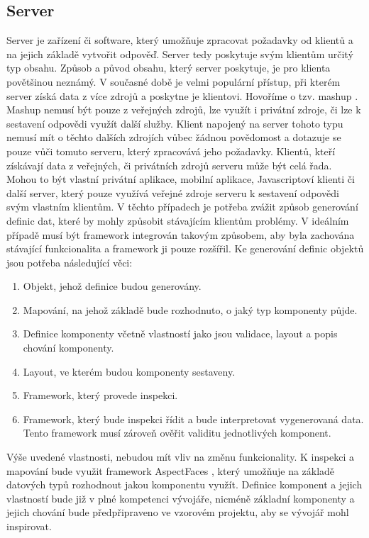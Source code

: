 \subsection{Server}
Server je zařízení či software, který umožňuje zpracovat požadavky od klientů a na jejich základě vytvořit odpověď. Server tedy poskytuje svým klientům určitý typ obsahu. Způsob a původ obsahu, který server poskytuje, je pro klienta povětšinou neznámý. V současné době je velmi populární přístup, při kterém server získá data z více zdrojů a poskytne je klientovi. Hovoříme o tzv. mashup \cite{Tuchinda2008}. Mashup nemusí být pouze z veřejných zdrojů, lze využít i privátní zdroje, či lze k sestavení odpovědi využít další služby. Klient napojený na server tohoto typu nemusí mít o těchto dalších zdrojích vůbec žádnou povědomost a dotazuje se pouze vůči tomuto serveru, který zpracovává jeho požadavky. 
Klientů, kteří získávají data z veřejných, či privátních zdrojů serveru může být celá řada. Mohou to být vlastní privátní aplikace, mobilní aplikace, Javascriptoví klienti či další server, který pouze využívá veřejné zdroje serveru k sestavení odpovědi svým vlastním klientům. V těchto případech je potřeba zvážit způsob generování definic dat, které by mohly způsobit stávajícím klientům problémy. V ideálním případě musí být framework integrován takovým způsobem, aby byla zachována stávající funkcionalita a framework ji pouze rozšířil. 
Ke generování definic objektů jsou potřeba následující věci:
\begin{enumerate}
\item Objekt, jehož definice budou generovány.
\item Mapování, na jehož základě bude rozhodnuto, o jaký typ komponenty půjde.
\item Definice komponenty včetně vlastností jako jsou validace, layout a popis chování komponenty.
\item Layout, ve kterém budou komponenty sestaveny.
\item Framework, který provede inspekci.
\item Framework, který bude inspekci řídit a bude interpretovat vygenerovaná data. Tento framework musí zároveň ověřit validitu jednotlivých komponent.
\end{enumerate}

Výše uvedené vlastnosti, nebudou mít vliv na změnu funkcionality. K inspekci a mapování bude využit framework AspectFaces \cite{aspectFaces}, který umožňuje na základě datových typů rozhodnout jakou komponentu využít. Definice komponent a jejich vlastností bude již v plné kompetenci vývojáře, nicméně základní komponenty a jejich chování bude předpřipraveno ve vzorovém projektu, aby se vývojář mohl inspirovat.

